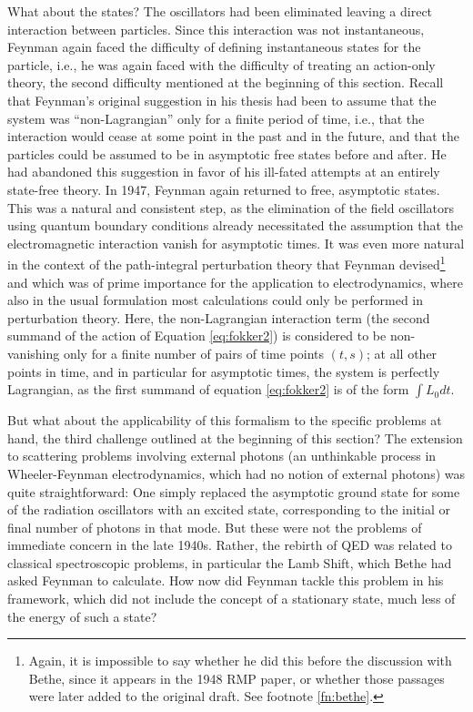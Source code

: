\documentclass[12pt]{article}
\begin{document}
What about the states? The oscillators had been eliminated leaving a direct interaction between particles. Since this interaction was not instantaneous, Feynman again faced the difficulty of defining instantaneous states for the particle, i.e., he was again faced with the difficulty of treating an action-only theory, the second difficulty mentioned at the beginning of this section. Recall that Feynman's original suggestion in his thesis had been to assume that the system was ``non-Lagrangian'' only for a finite period of time, i.e., that the interaction would cease at some point in the past and in the future, and that the particles could be assumed to be in asymptotic free states before and after. He had abandoned this suggestion in favor of his ill-fated attempts at an entirely state-free theory. In 1947, Feynman again returned to free, asymptotic states. This was a natural and consistent step, as the elimination of the field oscillators using quantum boundary conditions already necessitated the assumption that the electromagnetic interaction vanish for asymptotic times. It was even more natural in the context of the path-integral perturbation theory that Feynman devised\footnote{Again, it is impossible to say whether he did this before the discussion with Bethe, since it appears in the 1948 RMP paper, or whether those passages were later added to the original draft. See footnote \ref{fn:bethe}.} and which was of prime importance for the application to electrodynamics, where also in the usual formulation most calculations could only be performed in perturbation theory. Here, the non-Lagrangian interaction term (the second summand of the action of Equation \ref{eq:fokker2}) is considered to be non-vanishing only for a finite number of pairs of time points $(t,s)$; at all other points in time, and in particular for asymptotic times, the system is perfectly Lagrangian, as the first summand of equation \ref{eq:fokker2} is of the form $\int L_0 dt$.

But what about the applicability of this formalism to the specific problems at hand, the third challenge outlined at the beginning of this section? The extension to scattering problems involving external photons (an unthinkable process in Wheeler-Feynman electrodynamics, which had no notion of external photons) was quite straightforward: One simply replaced the asymptotic ground state for some of the radiation oscillators with an excited state, corresponding to the initial or final number of photons in that mode. But these were not the problems of immediate concern in the late 1940s. Rather, the rebirth of QED was related to classical spectroscopic problems, in particular the Lamb Shift, which Bethe had asked Feynman to calculate. How now did Feynman tackle this problem in his framework, which did not include the concept of a stationary state, much less of the energy of such a state?
\end{document}
